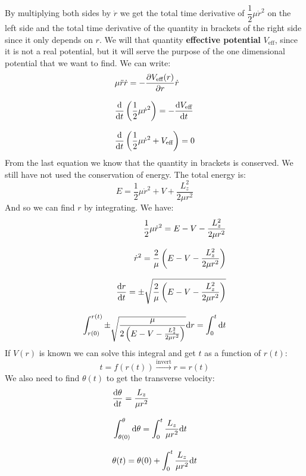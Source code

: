 By multiplying both sides by $\dot{r}$ we get the total time derivative of $\dfrac{1}{2}\mu \dot{r}^2$ on the left side and the total time derivative of the quantity in brackets of the right side since it only depends on $r$. We will that quantity \textbf{effective potential} $V_{\text{eff}}$, since it is not a real potential, but it will serve the purpose of the one dimensional potential that we want to find. We can write:
\begin{equation}
    \begin{split}
        &\mu \ddot{r}\dot{r} = -\pdv{V_{\text{eff}}(r)}{r}\dot{r} \\[8pt]
        &\dv{}{t}\brackets{\dfrac{1}{2}\mu \dot{r}^2} = -\dv{V_{\text{eff}}}{t} \\[8pt]
        &\dv{}{t}\brackets{\dfrac{1}{2}\mu \dot{r}^2 + V_{\text{eff}}} = 0
    \end{split}
\end{equation}
From the last equation we know that the quantity in brackets is conserved. We still have not used the conservation of energy. The total energy is:
\begin{equation}
    E = \dfrac{1}{2}\mu \dot{r}^2 + V + \dfrac{L_z^2}{2\mu r^2}
\end{equation}
And so we can find $r$ by integrating. We have:
\begin{equation}
    \begin{split}
        \dfrac{1}{2}\mu \dot{r}^2 = E - V - \dfrac{L_z^2}{2\mu r^2} \\[8pt]
        \dot{r}^2 = \dfrac{2}{\mu}\brackets{E - V - \dfrac{L_z^2}{2\mu r^2}} \\[8pt]
        \dv{r}{t} = \pm\sqrt{\dfrac{2}{\mu}\brackets{E - V - \dfrac{L_z^2}{2\mu r^2}}} \\[8pt]
        \int_{r(0)}^{r(t)}\pm\sqrt{\dfrac{\mu}{2\brackets{E - V - \frac{L_z^2}{2\mu r^2}}}}\diff{r} = \int_{0}^{t}\diff{t}
    \end{split}
\end{equation}
If $V(r)$ is known we can solve this integral and get $t$ as a function of $r(t)$:
\begin{equation}
  t = f(r(t)) \xrightarrow{\text{invert}} r = r(t)
\end{equation}
We also need to find $\theta(t)$ to get the transverse velocity:
\begin{equation}
  \begin{split}
    &\dv{\theta}{t} = \dfrac{L_z}{\mu r^2} \\[8pt]
    &\int_{\theta(0)}^{\theta}\diff{\theta} = \int_{0}^{t}\dfrac{L_z}{\mu r^2}\diff{t} \\[8pt]
    &\theta(t) = \theta(0) + \int_{0}^{t}\dfrac{L_z}{\mu r^2}\diff{t}
  \end{split}
\end{equation}
